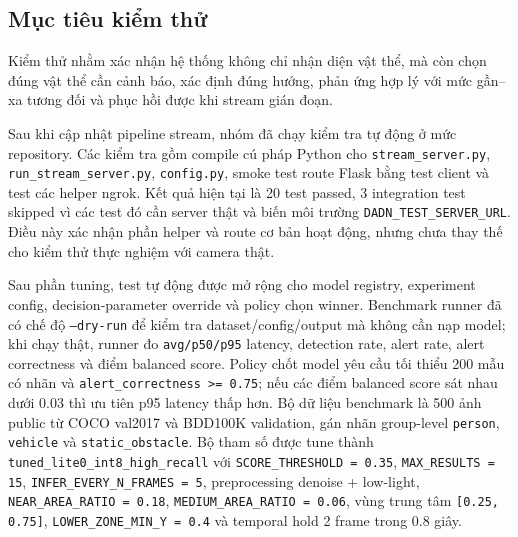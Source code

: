\documentclass[oneside,final]{hcmut-report}
\begin{document}
\subsection{Mục tiêu kiểm thử}
Kiểm thử nhằm xác nhận hệ thống không chỉ nhận diện vật thể, mà còn chọn đúng vật thể cần cảnh báo, xác định đúng hướng, phản ứng hợp lý với mức gần--xa tương đối và phục hồi được khi stream gián đoạn.

Sau khi cập nhật pipeline stream, nhóm đã chạy kiểm tra tự động ở mức repository. Các kiểm tra gồm compile cú pháp Python cho \texttt{stream\_server.py}, \texttt{run\_stream\_server.py}, \texttt{config.py}, smoke test route Flask bằng test client và test các helper ngrok. Kết quả hiện tại là 20 test passed, 3 integration test skipped vì các test đó cần server thật và biến môi trường \texttt{DADN\_TEST\_SERVER\_URL}. Điều này xác nhận phần helper và route cơ bản hoạt động, nhưng chưa thay thế cho kiểm thử thực nghiệm với camera thật.

Sau phần tuning, test tự động được mở rộng cho model registry, experiment config, decision-parameter override và policy chọn winner. Benchmark runner đã có chế độ \texttt{--dry-run} để kiểm tra dataset/config/output mà không cần nạp model; khi chạy thật, runner đo \texttt{avg/p50/p95} latency, detection rate, alert rate, alert correctness và điểm balanced score. Policy chốt model yêu cầu tối thiểu 200 mẫu có nhãn và \texttt{alert\_correctness >= 0.75}; nếu các điểm balanced score sát nhau dưới 0.03 thì ưu tiên p95 latency thấp hơn. Bộ dữ liệu benchmark là 500 ảnh public từ COCO val2017 và BDD100K validation, gán nhãn group-level \texttt{person}, \texttt{vehicle} và \texttt{static\_obstacle}. Bộ tham số được tune thành \texttt{tuned\_lite0\_int8\_high\_recall} với \texttt{SCORE\_THRESHOLD = 0.35}, \texttt{MAX\_RESULTS = 15}, \texttt{INFER\_EVERY\_N\_FRAMES = 5}, preprocessing denoise + low-light, \texttt{NEAR\_AREA\_RATIO = 0.18}, \texttt{MEDIUM\_AREA\_RATIO = 0.06}, vùng trung tâm \texttt{[0.25, 0.75]}, \texttt{LOWER\_ZONE\_MIN\_Y = 0.4} và temporal hold 2 frame trong 0.8 giây.
\end{document}
